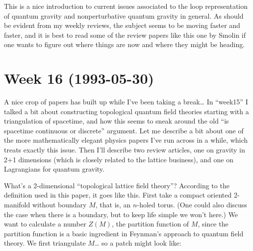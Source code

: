 \documentclass{article}
\def\tightlist{}
\renewcommand{\texttt}[1]{%
  \begingroup
  \ttfamily
  \begingroup\lccode`~=`/\lowercase{\endgroup\def~}{/\discretionary{}{}{}}%
  \begingroup\lccode`~=`[\lowercase{\endgroup\def~}{[\discretionary{}{}{}}%
  \begingroup\lccode`~=`.\lowercase{\endgroup\def~}{.\discretionary{}{}{}}%
  \catcode`/=\active\catcode`[=\active\catcode`.=\active
  \scantokens{#1\noexpand}%
  \endgroup
}
\begin{document}

This is a nice introduction to current issues associated to the loop
representation of quantum gravity and nonperturbative quantum gravity in
general. As should be evident from my weekly reviews, the subject seems
to be moving faster and faster, and it is best to read some of the
review papers like this one by Smolin if one wants to figure out where
things are now and where they might be heading.
\hypertarget{week-16-1993-05-30}{%
\section{Week 16 (1993-05-30)}\label{week-16-1993-05-30}}

A nice crop of papers has built up while I've been taking a
break\ldots{} In ``week15'' I talked a bit about constructing
topological quantum field theories starting with a triangulation of
spacetime, and how this seems to sneak around the old ``is spacetime
continuous or discrete'' argument. Let me describe a bit about one of
the more mathematically elegant physics papers I've run across in a
while, which treats exactly this issue. Then I'll describe two review
articles, one on gravity in 2+1 dimensions (which is closely related to
the lattice business), and one on Lagrangians for quantum gravity.


What's a 2-dimensional ``topological lattice field theory''? According
to the definition used in this paper, it goes like this. First take a
compact oriented 2-manifold without boundary \(M\), that is, an
\(n\)-holed torus. (One could also discuss the case when there is a
boundary, but to keep life simple we won't here.) We want to calculate a
number \(Z(M)\), the partition function of \(M\), since the partition
function is a basic ingredient in Feynman's approach to quantum field
theory. We first triangulate \(M\)\ldots{} so a patch might look like:
\end{document}
